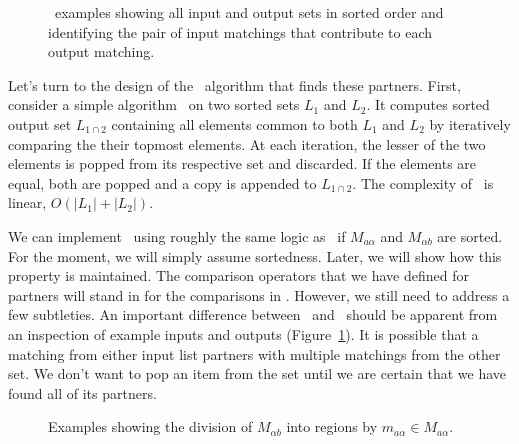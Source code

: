 \figpreamble
\begin{figure}
	\figfontsize{
	\begin{center}
		
	\end{center}}
	\figpostamble
	\caption[\queryfunc\ examples.]{\queryfunc\ examples showing all input and output
	 	sets in sorted order and identifying the pair of input
		matchings that contribute to each output matching.}
	\label{fig:merge-example}
\end{figure}


\noindent Let's turn to the design of the \queryfunc\ algorithm that finds these partners.
First, consider a simple algorithm \intersectfunc\ on two sorted sets $L_1$ and $L_2$.
It computes sorted output set $L_{1 \cap 2}$ containing all
elements common to both $L_1$ and $L_2$ by iteratively comparing the
their topmost elements.  At each iteration, the lesser of the 
two elements is popped from its respective set and discarded.  If the elements
are equal, both are popped and a copy is appended to $L_{1 \cap 2}$.
The complexity of \intersectfunc\ is linear, $O(|L_1| + |L_2|)$.

We can implement \queryfunc\ using
roughly the same logic as \intersectfunc\ if 
$M_{a\alpha}$ and $M_{\alpha{}b}$ are sorted.
For the moment, we will simply assume sortedness.  Later, we will
show how this property is maintained.
The comparison operators that we have defined for partners will
stand in for the comparisons in \intersectfunc.
However, we still need to address a few subtleties.
An important difference between \queryfunc\ and \intersectfunc\
should be apparent from an inspection of example inputs and
outputs (Figure~\ref{fig:merge-example}).  It is possible 
that a matching from either input list partners with multiple
matchings from the other set.  We don't want to pop an item
from the set until we are certain that we have found all of
its partners.

\figpreamble
\begin{figure}
	\figfontsize{
	\begin{center}
		
	\end{center}}
	\figpostamble
	\caption{Examples showing the division of $M_{\alpha{}b}$
		into regions by $m_{a\alpha} \in M_{a\alpha}$.}
	\label{fig:prefix-region}
\end{figure}

